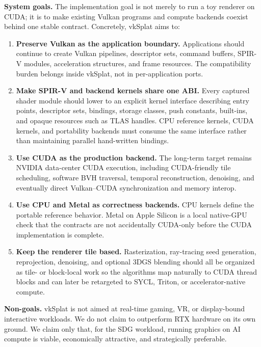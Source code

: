 \documentclass[10pt,journal]{IEEEtran}
\begin{document}
\textbf{System goals.} The implementation goal is not merely to run a
toy renderer on CUDA; it is to make existing Vulkan programs and
compute backends coexist behind one stable contract. Concretely, vkSplat
aims to:

\begin{enumerate}
    \item \textbf{Preserve Vulkan as the application boundary.}
    Applications should continue to create Vulkan pipelines, descriptor
    sets, command buffers, SPIR-V modules, acceleration structures, and
    frame resources. The compatibility burden belongs inside vkSplat,
    not in per-application ports.

    \item \textbf{Make SPIR-V and backend kernels share one ABI.}
    Every captured shader module should lower to an explicit kernel
    interface describing entry points, descriptor sets, bindings,
    storage classes, push constants, built-ins, and opaque resources
    such as TLAS handles. CPU reference kernels, CUDA kernels, and
    portability backends must consume the same interface rather than
    maintaining parallel hand-written bindings.

    \item \textbf{Use CUDA as the production backend.} The long-term
    target remains NVIDIA data-center CUDA execution, including
    CUDA-friendly tile scheduling, software BVH traversal, temporal
    reconstruction, denoising, and eventually direct Vulkan--CUDA
    synchronization and memory interop.

    \item \textbf{Use CPU and Metal as correctness backends.} CPU
    kernels define the portable reference behavior. Metal on Apple
    Silicon is a local native-GPU check that the contracts are not
    accidentally CUDA-only before the CUDA implementation is complete.

    \item \textbf{Keep the renderer tile based.} Rasterization,
    ray-tracing seed generation, reprojection, denoising, and optional
    3DGS blending should all be organized as tile- or block-local work
    so the algorithms map naturally to CUDA thread blocks and can later
    be retargeted to SYCL, Triton, or accelerator-native compute.
\end{enumerate}

\textbf{Non-goals.} vkSplat is not aimed at real-time gaming, VR, or
display-bound interactive workloads. We do not claim to outperform RTX
hardware on its own ground. We claim only that, for the SDG workload,
running graphics on AI compute is viable, economically attractive, and
strategically preferable.
\end{document}

